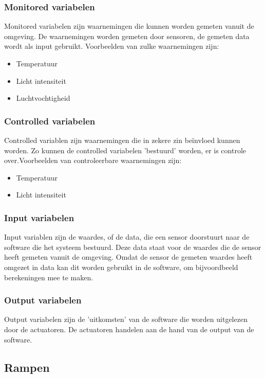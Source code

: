 \documentclass{article}%
\begin{document}
\subsubsection{Monitored variabelen}
Monitored variabelen zijn waarnemingen die kunnen worden gemeten vanuit de omgeving. De waarnemingen worden gemeten door sensoren, de gemeten data wordt als input gebruikt. Voorbeelden van zulke waarnemingen zijn:
\begin{itemize}
  \item Temperatuur
  \item Licht intensiteit
  \item Luchtvochtigheid
\end{itemize}

\subsubsection{Controlled variabelen}
Controlled variablen zijn waarnemingen die in zekere zin beïnvloed kunnen worden. Zo kunnen de controlled variabelen 'bestuurd' worden, er is controle over.Voorbeelden van controleerbare waarnemingen zijn:
\begin{itemize}
  \item Temperatuur
  \item Licht intensiteit
\end{itemize}

\subsubsection{Input variabelen}
Input variablen zijn de waardes, of de data, die een sensor doorstuurt naar de software die het systeem bestuurd. Deze data staat voor de waardes die de sensor heeft gemeten vanuit de omgeving. Omdat de sensor de gemeten waardes heeft omgezet in data kan dit worden gebruikt in de software, om bijvoordbeeld berekeningen mee te maken.

\subsubsection{Output variabelen}
Output variabelen zijn de 'uitkomsten' van de software die worden uitgelezen door de actuatoren. De actuatoren handelen aan de hand van de output van de software.

\subsection{Rampen}
\end{document}
